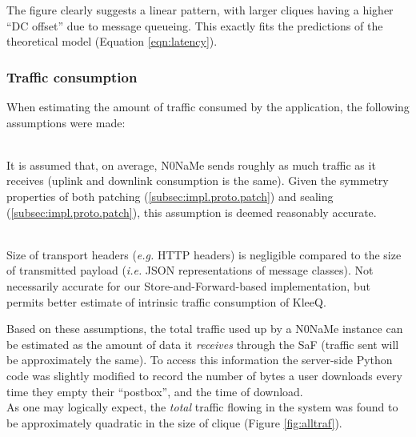 \documentclass[a4paper, twoside, 12pt]{report}
\newcommand{\funkytt}{\fontfamily{AnonymousPro}\selectfont}
\begin{document}
The figure clearly suggests a linear pattern, with larger cliques having a higher ``DC offset'' due to message queueing. This exactly fits the predictions of the theoretical model (Equation \ref{eqn:latency}).


\subsubsection{Traffic consumption}
When estimating the amount of traffic consumed by the application, the following assumptions were made:
\begin{description}[labelindent=0.5cm, leftmargin=1.3cm, rightmargin=0.5cm]
    \item[Symmetry] \hfill \\
        It is assumed that, on average, {\funkytt N0NaMe} sends roughly as much traffic as it receives (uplink and downlink consumption is the same). Given the symmetry properties of both patching (\cref{subsec:impl.proto.patch}) and sealing (\cref{subsec:impl.proto.patch}), this assumption is deemed reasonably accurate.
    \item[Zero-cost transport] \hfill \\
        Size of transport headers (\textit{e.g.} HTTP headers) is negligible compared to the size of transmitted payload (\textit{i.e.} JSON representations of message classes). Not necessarily accurate for our Store-and-Forward-based implementation, but permits better estimate of intrinsic traffic consumption of KleeQ.
\end{description}

Based on these assumptions, the total traffic used up by a {\funkytt N0NaMe} instance can be estimated as the amount of data it \emph{receives} through the SaF (traffic sent will be approximately the same). To access this information the server-side Python code was slightly modified to record the number of bytes a user downloads every time they empty their ``postbox'', and the time of download. \\

As one may logically expect, the \emph{total} traffic flowing in the system was found to be approximately quadratic in the size of clique (Figure \ref{fig:alltraf}).
\end{document}
